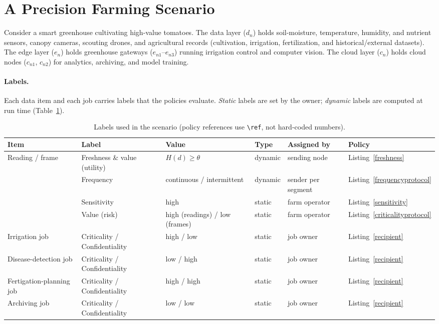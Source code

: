 
\section{A Precision Farming Scenario}\label{sec:scenario}
Consider a smart greenhouse cultivating high-value tomatoes. The \textsf{data layer} ($d_n$) holds soil-moisture,
temperature, humidity, and nutrient sensors, canopy cameras, scouting drones, and agricultural records (cultivation,
irrigation, fertilization, and historical/external datasets). The \textsf{edge layer} ($e_n$) holds greenhouse
gateways ($e_{n1}$--$e_{n3}$) running irrigation control and computer vision. The \textsf{cloud layer} ($c_n$) holds
cloud nodes ($c_{n1}$, $c_{n2}$) for analytics, archiving, and model training.

\paragraph{Labels.} Each data item and each job carries labels that the policies evaluate. \textit{Static} labels are
set by the owner; \textit{dynamic} labels are computed at run time (Table~\ref{tab:labels}).

\begin{table}[htbp]\scriptsize\centering
\caption{Labels used in the scenario (policy references use \texttt{\textbackslash ref}, not hard-coded numbers).}\label{tab:labels}
\begin{tabular}{llllll}
\toprule
Item & Label & Value & Type & Assigned by & Policy\\
\midrule
Reading / frame & Freshness \& value (utility) & $H(d)\ge\theta$ & dynamic & sending node & Listing~\ref{freshness}\\
 & Frequency & continuous / intermittent & dynamic & sender per segment & Listing~\ref{frequencyprotocol}\\
 & Sensitivity & high & static & farm operator & Listing~\ref{sensitivity}\\
 & Value (risk) & high (readings) / low (frames) & static & farm operator & Listing~\ref{criticalityprotocol}\\
Irrigation job & Criticality / Confidentiality & high / low & static & job owner & Listing~\ref{recipient}\\
Disease-detection job & Criticality / Confidentiality & low / high & static & job owner & Listing~\ref{recipient}\\
Fertigation-planning job & Criticality / Confidentiality & high / high & static & job owner & Listing~\ref{recipient}\\
Archiving job & Criticality / Confidentiality & low / low & static & job owner & Listing~\ref{recipient}\\
\bottomrule
\end{tabular}
\end{table}


